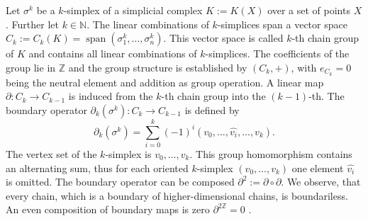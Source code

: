 \documentclass[runningheads]{llncs}
\DeclareMathOperator{\SP}{\text{span}}
\begin{document}
Let $\sigma^k$ be a $k$-simplex of a simplicial complex $K := K(X)$ over a set of points $X$. Further let $k \in \mathbb{N}$. The linear combinations of $k$-simplices span a vector space $C_k := C_k(K) = \SP\left(\sigma_1^k, \ldots, \sigma_n^k\right).$ This vector space is called $k$-th chain group of $K$ and contains all linear combinations of $k$-simplices. The coefficients of the group lie in $\mathbb{Z}$ and the group structure is established by $(C_k,+)$, with $e_{C_k}=0$ being the neutral element and addition as group operation. A linear map $\partial:C_k \rightarrow C_{k-1}$ is induced from the $k$-th chain group into the $(k-1)$-th.  The boundary operator $\partial_k(\sigma^k): C_k \rightarrow C_{k-1}$ is defined by
\begin{equation}
  \partial_k(\sigma^k) = \sum_{i=0}^{k} (-1)^i \left(v_0, \ldots, \widehat{v_i},\ldots,v_k\right).
\end{equation}
The vertex set of the $k$-simplex is $v_0,\ldots,v_k$. This group homomorphism contains an alternating sum, thus for each oriented $k$-simplex $(v_0, \ldots, v_k)$ one element $\widehat{v_i}$ is omitted. The boundary operator can be composed $\partial^2 := \partial \circ \partial$. We observe, that every chain, which is a boundary of higher-dimensional chains, is boundariless. An even composition of boundary maps is zero $\partial^{2\mathbb{Z}} = 0$ \cite{hatcher2005algebraic}.
\end{document}
